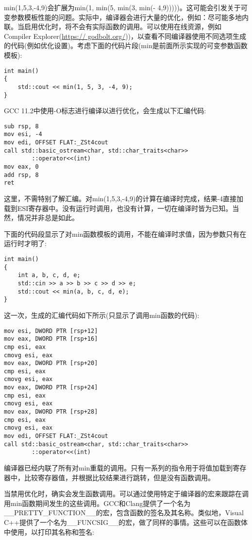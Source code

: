 min(1,5,3,-4,9)会扩展为min(1, min(5, min(3, min(- 4,9)))))。这可能会引发关于可变参数模板性能的问题。实际中，编译器会进行大量的优化，例如：尽可能多地内联。当启用优化时，将不会有实际函数的调用。可以使用在线资源，例如Compiler Explorer(\url{https:// godbolt.org/}))，以查看不同编译器使用不同选项生成的代码(例如优化设置)。考虑下面的代码片段(min是前面所示实现的可变参数函数模板):

\begin{lstlisting}[style=styleCXX]
int main()
{
	std::cout << min(1, 5, 3, -4, 9);
}
\end{lstlisting}

GCC 11.2中使用-O标志进行编译以进行优化，会生成以下汇编代码:

\begin{lstlisting}[style=styleCXX]
sub rsp, 8
mov esi, -4
mov edi, OFFSET FLAT:_ZSt4cout
call std::basic_ostream<char, std::char_traits<char>>
        ::operator<<(int)
mov eax, 0
add rsp, 8
ret
\end{lstlisting}

这里，不需特别了解汇编。对min(1,5,3,-4,9)的计算在编译时完成，结果-4直接加载到ESI寄存器中。没有运行时调用，也没有计算，一切在编译时皆为已知。当然，情况并非总是如此。

下面的代码段显示了对min函数模板的调用，不能在编译时求值，因为参数只有在运行时才明了:

\begin{lstlisting}[style=styleCXX]
int main()
{
	int a, b, c, d, e;
	std::cin >> a >> b >> c >> d >> e;
	std::cout << min(a, b, c, d, e);
}
\end{lstlisting}

这一次，生成的汇编代码如下所示(只显示了调用min函数的代码):

\begin{lstlisting}[style=styleCXX]
mov esi, DWORD PTR [rsp+12]
mov eax, DWORD PTR [rsp+16]
cmp esi, eax
cmovg esi, eax
mov eax, DWORD PTR [rsp+20]
cmp esi, eax
cmovg esi, eax
mov eax, DWORD PTR [rsp+24]
cmp esi, eax
cmovg esi, eax
mov eax, DWORD PTR [rsp+28]
cmp esi, eax
cmovg esi, eax
mov edi, OFFSET FLAT:_ZSt4cout
call std::basic_ostream<char, std::char_traits<char>>
        ::operator<<(int)
\end{lstlisting}

编译器已经内联了所有对min重载的调用。只有一系列的指令用于将值加载到寄存器中，比较寄存器值，并根据比较结果进行跳转，但是没有函数调用。

当禁用优化时，确实会发生函数调用。可以通过使用特定于编译器的宏来跟踪在调用min函数期间发生的这些调用。GCC和Clang提供了一个名为\_\_PRETTY\_FUNCTION\_\_的宏，包含函数的签名及其名称。类似地，Visual C++提供了一个名为\_\_FUNCSIG\_\_的宏，做了同样的事情。这些可以在函数体中使用，以打印其名称和签名:


